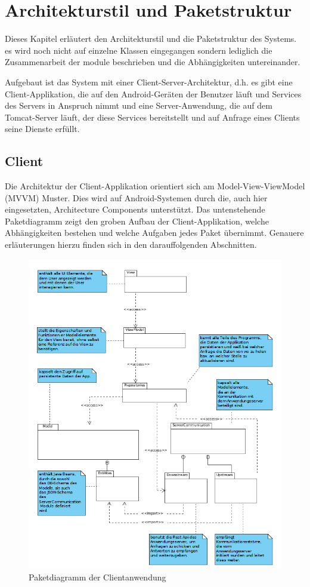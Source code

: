 \documentclass[parskip=full]{scrartcl}
\begin{document}
\newpage

\section{Architekturstil und Paketstruktur}
Dieses Kapitel erläutert den Architekturstil und die Paketstruktur des Systems. es wird noch nicht auf einzelne Klassen eingegangen sondern lediglich die Zusammenarbeit der module beschrieben und die Abhängigkeiten untereinander.

Aufgebaut ist das System mit einer Client-Server-Architektur, d.h. es gibt eine Client-Applikation, die auf den Android-Geräten der Benutzer läuft und Services des Servers in Anspruch nimmt und eine Server-Anwendung, die auf dem Tomcat-Server läuft, der diese Services bereitstellt und auf Anfrage eines Clients seine Dienste erfüllt.

\subsection{Client}
Die Architektur der Client-Applikation orientiert sich am Model-View-ViewModel (MVVM) Muster. Dies wird auf Android-Systemen durch die, auch hier eingesetzten, Architecture Components unterstützt. Das untenstehende Paketdiagramm zeigt den groben Aufbau der Client-Applikation, welche Abhängigkeiten bestehen und welche Aufgaben jedes Paket übernimmt. Genauere erläuterungen hierzu finden sich in den darauffolgenden Abschnitten.

\begin{figure}[H]
	\centering
	\includegraphics[scale=0.5]{../Klassendiagramme/paketdiagramm_client.png}
	\caption{Paketdiagramm der Clientanwendung}
\end{figure}
\end{document}
